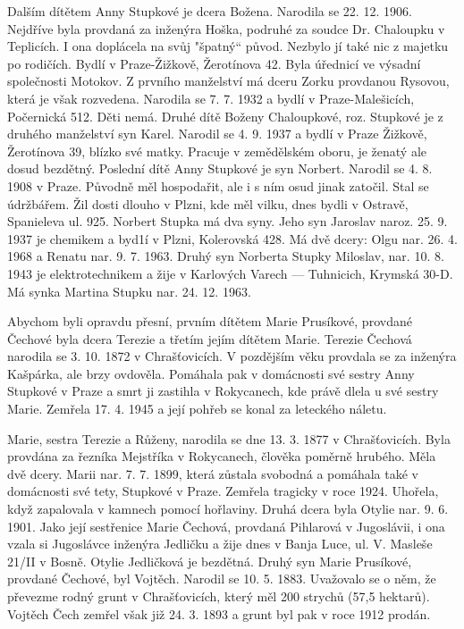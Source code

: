 \documentclass[../dejiny-rodu-prusiku.tex]{subfiles}
\begin{document}
Dalším dítětem Anny Stupkové je dcera Božena. Narodila se 22. 12. 1906. Nejdříve byla provdaná za inženýra Hoška, podruhé za soudce Dr. Chaloupku v Teplicích. I ona doplácela na svůj "špatný“ původ. Nezbylo jí také nic z majetku po rodičích. Bydlí v Praze-Žižkově, Žerotínova 42. Byla úřednicí ve výsadní společnosti Motokov. Z prvního manželství má dceru Zorku provdanou Rysovou, která je však rozvedena. Narodila se 7. 7. 1932 a bydlí v Praze-Malešicích, Počernická 512. Děti nemá. Druhé dítě Boženy Chaloupkové, roz. Stupkové je z druhého manželství syn Karel. Narodil se 4. 9. 1937 a bydlí v Praze Žižkově, Žerotínova 39, blízko své matky. Pracuje v zemědělském oboru, je ženatý ale dosud bezdětný. Poslední dítě Anny Stupkové je syn Norbert. Narodil se 4. 8. 1908 v Praze. Původně měl hospodařit, ale i s ním osud jinak zatočil. Stal se údržbářem. Žil dosti dlouho v Plzni, kde měl vilku, dnes bydli v Ostravě, Spanieleva ul. 925. Norbert Stupka má dva syny. Jeho syn Jaroslav naroz. 25. 9. 1937 je chemikem a byd1í v Plzni, Kolerovská 428. Má dvě dcery: Olgu nar. 26. 4. 1968 a Renatu nar. 9. 7. 1963. Druhý syn Nor­berta Stupky Miloslav, nar. 10. 8. 1943 je elektrotechni­kem a žije v Karlových Varech — Tuhnicich, Krymská 30-D. Má synka Martina Stupku nar. 24. 12. 1963.

Abychom byli opravdu přesní, prvním dítětem Marie Prusíkové, provdané Čechové byla dcera Terezie a třetím jejím dítětem Marie. Terezie Čechová narodila se 3. 10. 1872 v Chrašťovicích. V pozdějším věku provdala se za inženýra Kašpárka, ale
brzy ovdověla. Pomáhala pak v domácnosti své sestry Anny Stupkové v Praze a smrt ji zastihla v Rokycanech, kde právě dlela u své sestry Marie. Zemřela 17. 4. 1945 a její pohřeb se konal za leteckého náletu.

Marie, sestra Terezie a Růženy, narodila se dne 13. 3. 1877 v Chrašťovicích. Byla provdána za řezníka Mejstříka v Rokycanech, člověka poměrně hrubého. Měla dvě dcery. Marii nar. 7. 7. 1899, která zůstala svobodná a pomáhala také v domácnosti své tety, Stupkové v Praze. Zemřela tragicky v roce 1924. Uhořela, když zapalovala v kamnech pomocí hořlaviny. Druhá dcera  byla Otylie nar. 9. 6. 1901. Jako její sestřenice Marie Čechová, provdaná Pihlarová v Jugoslávii, i ona vzala si Jugoslávce inženýra Jedličku a žije dnes v Banja Luce, ul. V. Masleše 21/II v Bosně. Otylie Jedličková je bezdětná. Druhý syn Marie Prusíkové, provdané Čechové, byl Vojtěch. Narodil se 10.  5. 1883. Uvažovalo se o něm, že převezme rodný grunt v Chrašťovicích, který měl 200 strychů (57,5 hektarů). Vojtěch Čech zemřel však již 24. 3. 1893 a grunt byl pak v roce 1912 prodán.
\end{document}
